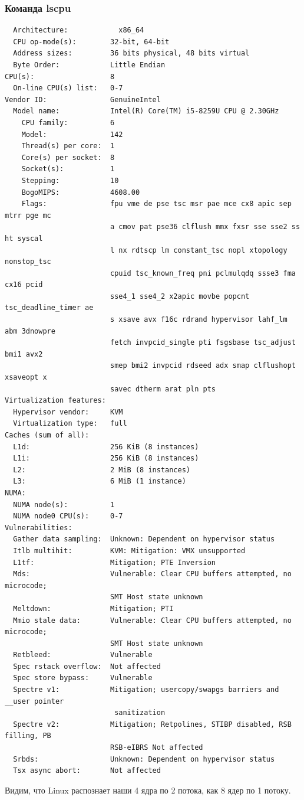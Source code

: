 \subsubsection{Команда lscpu}
\begin{verbatim}
  Architecture:            x86_64
  CPU op-mode(s):        32-bit, 64-bit
  Address sizes:         36 bits physical, 48 bits virtual
  Byte Order:            Little Endian
CPU(s):                  8
  On-line CPU(s) list:   0-7
Vendor ID:               GenuineIntel
  Model name:            Intel(R) Core(TM) i5-8259U CPU @ 2.30GHz
    CPU family:          6
    Model:               142
    Thread(s) per core:  1
    Core(s) per socket:  8
    Socket(s):           1
    Stepping:            10
    BogoMIPS:            4608.00
    Flags:               fpu vme de pse tsc msr pae mce cx8 apic sep mtrr pge mc
                         a cmov pat pse36 clflush mmx fxsr sse sse2 ss ht syscal
                         l nx rdtscp lm constant_tsc nopl xtopology nonstop_tsc 
                         cpuid tsc_known_freq pni pclmulqdq ssse3 fma cx16 pcid 
                         sse4_1 sse4_2 x2apic movbe popcnt tsc_deadline_timer ae
                         s xsave avx f16c rdrand hypervisor lahf_lm abm 3dnowpre
                         fetch invpcid_single pti fsgsbase tsc_adjust bmi1 avx2 
                         smep bmi2 invpcid rdseed adx smap clflushopt xsaveopt x
                         savec dtherm arat pln pts
Virtualization features: 
  Hypervisor vendor:     KVM
  Virtualization type:   full
Caches (sum of all):     
  L1d:                   256 KiB (8 instances)
  L1i:                   256 KiB (8 instances)
  L2:                    2 MiB (8 instances)
  L3:                    6 MiB (1 instance)
NUMA:                    
  NUMA node(s):          1
  NUMA node0 CPU(s):     0-7
Vulnerabilities:         
  Gather data sampling:  Unknown: Dependent on hypervisor status
  Itlb multihit:         KVM: Mitigation: VMX unsupported
  L1tf:                  Mitigation; PTE Inversion
  Mds:                   Vulnerable: Clear CPU buffers attempted, no microcode; 
                         SMT Host state unknown
  Meltdown:              Mitigation; PTI
  Mmio stale data:       Vulnerable: Clear CPU buffers attempted, no microcode; 
                         SMT Host state unknown
  Retbleed:              Vulnerable
  Spec rstack overflow:  Not affected
  Spec store bypass:     Vulnerable
  Spectre v1:            Mitigation; usercopy/swapgs barriers and __user pointer
                          sanitization
  Spectre v2:            Mitigation; Retpolines, STIBP disabled, RSB filling, PB
                         RSB-eIBRS Not affected
  Srbds:                 Unknown: Dependent on hypervisor status
  Tsx async abort:       Not affected

\end{verbatim}
Видим, что Linux распознает наши 4 ядра по 2 потока, как 8 ядер по 1 потоку.
